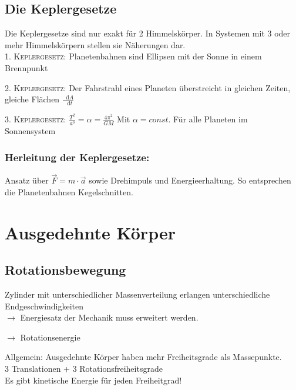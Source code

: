 \documentclass[a4paper,12pt]{report}
\newcommand*\diff{\mathop{}\!\mathrm{d}}
\begin{document}
\subsection{Die Keplergesetze}

Die Keplergesetze sind nur exakt für 2 Himmelskörper. In Systemen mit 3 oder mehr Himmelskörpern stellen sie Näherungen dar. \\

\textsc{1. Keplergesetz:}  Planetenbahnen sind Ellipsen mit der Sonne in einem Brennpunkt

\textsc{2. Keplergesetz:} Der Fahrstrahl eines Planeten überstreicht in gleichen Zeiten, gleiche Flächen $ \frac{\diff A}{\diff t} $

\textsc{3. Keplergesetz:} $ \frac{T^2}{a^3} = \alpha = \frac{4\pi^2}{GM} $  Mit $ \alpha =const. $  Für alle Planeten im Sonnensystem


\subsubsection{Herleitung der Keplergesetze:}

Ansatz über $\vec{F} = m \cdot \vec{a} $ sowie Drehimpuls und Energieerhaltung. So entsprechen die Planetenbahnen Kegelschnitten.\\

\section{Ausgedehnte Körper}

\subsection{Rotationsbewegung}

Zylinder mit unterschiedlicher Massenverteilung erlangen unterschiedliche Endgeschwindigkeiten \\

\quad $\rightarrow$ Energiesatz der Mechanik muss erweitert werden.

\quad $\rightarrow$ Rotationsenergie


Allgemein: Ausgedehnte Körper haben mehr Freiheitsgrade als Massepunkte. \\

	3 Translationen + 3 Rotationsfreiheitsgrade \\
	
Es gibt kinetische Energie für jeden Freiheitgrad! \\
\end{document}
